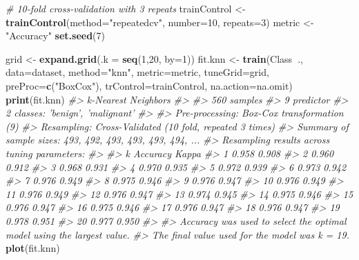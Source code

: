 \documentclass[]{book}
\newenvironment{Shaded}{\begin{snugshade}}{\end{snugshade}}
\newcommand{\CommentTok}[1]{\textcolor[rgb]{0.56,0.35,0.01}{\textit{#1}}}
\newcommand{\DataTypeTok}[1]{\textcolor[rgb]{0.13,0.29,0.53}{#1}}
\newcommand{\DecValTok}[1]{\textcolor[rgb]{0.00,0.00,0.81}{#1}}
\newcommand{\KeywordTok}[1]{\textcolor[rgb]{0.13,0.29,0.53}{\textbf{#1}}}
\newcommand{\NormalTok}[1]{#1}
\newcommand{\OperatorTok}[1]{\textcolor[rgb]{0.81,0.36,0.00}{\textbf{#1}}}
\newcommand{\StringTok}[1]{\textcolor[rgb]{0.31,0.60,0.02}{#1}}
\begin{document}
\begin{Shaded}
\begin{Highlighting}[]
\CommentTok{# 10-fold cross-validation with 3 repeats}
\NormalTok{trainControl <-}\StringTok{ }\KeywordTok{trainControl}\NormalTok{(}\DataTypeTok{method=}\StringTok{"repeatedcv"}\NormalTok{, }\DataTypeTok{number=}\DecValTok{10}\NormalTok{, }\DataTypeTok{repeats=}\DecValTok{3}\NormalTok{)}
\NormalTok{metric <-}\StringTok{ "Accuracy"}
\KeywordTok{set.seed}\NormalTok{(}\DecValTok{7}\NormalTok{)}

\NormalTok{grid <-}\StringTok{ }\KeywordTok{expand.grid}\NormalTok{(}\DataTypeTok{.k =} \KeywordTok{seq}\NormalTok{(}\DecValTok{1}\NormalTok{,}\DecValTok{20}\NormalTok{, }\DataTypeTok{by=}\DecValTok{1}\NormalTok{))}
\NormalTok{fit.knn <-}\StringTok{ }\KeywordTok{train}\NormalTok{(Class}\OperatorTok{~}\NormalTok{., }\DataTypeTok{data=}\NormalTok{dataset, }\DataTypeTok{method=}\StringTok{"knn"}\NormalTok{, }\DataTypeTok{metric=}\NormalTok{metric, }
                 \DataTypeTok{tuneGrid=}\NormalTok{grid, }
                 \DataTypeTok{preProc=}\KeywordTok{c}\NormalTok{(}\StringTok{"BoxCox"}\NormalTok{), }\DataTypeTok{trControl=}\NormalTok{trainControl, }
                 \DataTypeTok{na.action=}\NormalTok{na.omit)}
\KeywordTok{print}\NormalTok{(fit.knn)}
\CommentTok{#> k-Nearest Neighbors }
\CommentTok{#> }
\CommentTok{#> 560 samples}
\CommentTok{#>   9 predictor}
\CommentTok{#>   2 classes: 'benign', 'malignant' }
\CommentTok{#> }
\CommentTok{#> Pre-processing: Box-Cox transformation (9) }
\CommentTok{#> Resampling: Cross-Validated (10 fold, repeated 3 times) }
\CommentTok{#> Summary of sample sizes: 493, 492, 493, 493, 493, 494, ... }
\CommentTok{#> Resampling results across tuning parameters:}
\CommentTok{#> }
\CommentTok{#>   k   Accuracy  Kappa}
\CommentTok{#>    1  0.958     0.908}
\CommentTok{#>    2  0.960     0.912}
\CommentTok{#>    3  0.968     0.931}
\CommentTok{#>    4  0.970     0.935}
\CommentTok{#>    5  0.972     0.939}
\CommentTok{#>    6  0.973     0.942}
\CommentTok{#>    7  0.976     0.949}
\CommentTok{#>    8  0.975     0.946}
\CommentTok{#>    9  0.976     0.947}
\CommentTok{#>   10  0.976     0.949}
\CommentTok{#>   11  0.976     0.949}
\CommentTok{#>   12  0.976     0.947}
\CommentTok{#>   13  0.974     0.945}
\CommentTok{#>   14  0.975     0.946}
\CommentTok{#>   15  0.976     0.947}
\CommentTok{#>   16  0.975     0.946}
\CommentTok{#>   17  0.976     0.947}
\CommentTok{#>   18  0.976     0.947}
\CommentTok{#>   19  0.978     0.951}
\CommentTok{#>   20  0.977     0.950}
\CommentTok{#> }
\CommentTok{#> Accuracy was used to select the optimal model using the largest value.}
\CommentTok{#> The final value used for the model was k = 19.}
\KeywordTok{plot}\NormalTok{(fit.knn)}
\end{Highlighting}
\end{Shaded}
\end{document}
